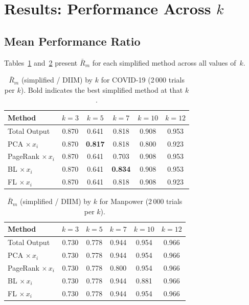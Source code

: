 \section{Results: Performance Across $k$}

\subsection{Mean Performance Ratio}

Tables~\ref{tab:covid-ratio-by-k} and~\ref{tab:manpower-ratio-by-k} present $\bar{R}_m$ for each simplified method across all values of~$k$.

\begin{table}[H]
\centering
\begin{tabular}{@{}lccccc@{}}
\toprule
\textbf{Method} & $k{=}3$ & $k{=}5$ & $k{=}7$ & $k{=}10$ & $k{=}12$ \\
\midrule
Total Output         & 0.870 & 0.641 & 0.818 & 0.908 & 0.953 \\
PCA $\times\, x_i$      & 0.870 & \textbf{0.817} & 0.818 & 0.800 & 0.923 \\
PageRank $\times\, x_i$ & 0.870 & 0.641 & 0.703 & 0.908 & 0.953 \\
BL $\times\, x_i$       & 0.870 & 0.641 & \textbf{0.834} & 0.908 & 0.953 \\
FL $\times\, x_i$       & 0.870 & 0.641 & 0.818 & 0.908 & 0.923 \\
\bottomrule
\end{tabular}
\caption{$\bar{R}_m$ (simplified / DIIM) by $k$ for COVID-19 (2\,000 trials per $k$). Bold indicates the best simplified method at that $k$.}
\label{tab:covid-ratio-by-k}
\end{table}

\begin{table}[H]
\centering
\begin{tabular}{@{}lccccc@{}}
\toprule
\textbf{Method} & $k{=}3$ & $k{=}5$ & $k{=}7$ & $k{=}10$ & $k{=}12$ \\
\midrule
Total Output         & 0.730 & 0.778 & 0.944 & 0.954 & 0.966 \\
PCA $\times\, x_i$      & 0.730 & 0.778 & 0.944 & 0.954 & 0.966 \\
PageRank $\times\, x_i$ & 0.730 & 0.778 & 0.800 & 0.954 & 0.966 \\
BL $\times\, x_i$       & 0.730 & 0.778 & 0.944 & 0.881 & 0.966 \\
FL $\times\, x_i$       & 0.730 & 0.778 & 0.944 & 0.954 & 0.966 \\
\bottomrule
\end{tabular}
\caption{$\bar{R}_m$ (simplified / DIIM) by $k$ for Manpower (2\,000 trials per $k$).}
\label{tab:manpower-ratio-by-k}
\end{table}

